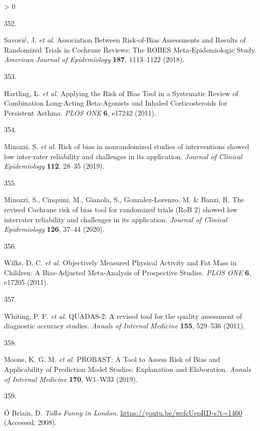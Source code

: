 \documentclass[a4paper, twoside]{templates/ociamthesis}
\newlength{\cslhangindent}
\newlength{\csllabelwidth}
\newenvironment{CSLReferences}[3] %
 {%
  \setlength{\parindent}{0pt}
  \ifodd #1 \everypar{\setlength{\hangindent}{\cslhangindent}}\ignorespaces\fi
  \ifnum #2 > 0
  \setlength{\parskip}{#2\baselineskip}
  \fi
 }%
 {}
\newcommand{\CSLLeftMargin}[1]{\parbox[t]{\maxof{\widthof{#1}}{\csllabelwidth}}{#1}}
\newcommand{\CSLRightInline}[1]{\parbox[t]{\linewidth - \csllabelwidth}{#1}}
\begin{document}
\begin{CSLReferences}{0}{0}
\leavevmode\hypertarget{ref-savovic2018}{}%
\CSLLeftMargin{352. }
\CSLRightInline{Savović, J. \emph{et al.} Association {Between Risk}-of-{Bias Assessments} and {Results} of {Randomized Trials} in {Cochrane Reviews}: The {ROBES Meta}-{Epidemiologic Study}. \emph{American Journal of Epidemiology} \textbf{187}, 1113--1122 (2018).}

\leavevmode\hypertarget{ref-hartling2011}{}%
\CSLLeftMargin{353. }
\CSLRightInline{Hartling, L. \emph{et al.} Applying the {Risk} of {Bias Tool} in a {Systematic Review} of {Combination Long}-{Acting Beta}-{Agonists} and {Inhaled Corticosteroids} for {Persistent Asthma}. \emph{PLOS ONE} \textbf{6}, e17242 (2011).}

\leavevmode\hypertarget{ref-minozzi2019}{}%
\CSLLeftMargin{354. }
\CSLRightInline{Minozzi, S. \emph{et al.} Risk of bias in nonrandomized studies of interventions showed low inter-rater reliability and challenges in its application. \emph{Journal of Clinical Epidemiology} \textbf{112}, 28--35 (2019).}

\leavevmode\hypertarget{ref-minozzi2020}{}%
\CSLLeftMargin{355. }
\CSLRightInline{Minozzi, S., Cinquini, M., Gianola, S., Gonzalez-Lorenzo, M. \& Banzi, R. The revised {Cochrane} risk of bias tool for randomized trials ({RoB} 2) showed low interrater reliability and challenges in its application. \emph{Journal of Clinical Epidemiology} \textbf{126}, 37--44 (2020).}

\leavevmode\hypertarget{ref-wilks2011}{}%
\CSLLeftMargin{356. }
\CSLRightInline{Wilks, D. C. \emph{et al.} Objectively {Measured Physical Activity} and {Fat Mass} in {Children}: A {Bias}-{Adjusted Meta}-{Analysis} of {Prospective Studies}. \emph{PLOS ONE} \textbf{6}, e17205 (2011).}

\leavevmode\hypertarget{ref-whiting2011}{}%
\CSLLeftMargin{357. }
\CSLRightInline{Whiting, P. F. \emph{et al.} {QUADAS}-2: A revised tool for the quality assessment of diagnostic accuracy studies. \emph{Annals of Internal Medicine} \textbf{155}, 529--536 (2011).}

\leavevmode\hypertarget{ref-moons2019}{}%
\CSLLeftMargin{358. }
\CSLRightInline{Moons, K. G. M. \emph{et al.} {PROBAST}: A {Tool} to {Assess Risk} of {Bias} and {Applicability} of {Prediction Model Studies}: Explanation and {Elaboration}. \emph{Annals of Internal Medicine} \textbf{170}, W1--W33 (2019).}

\leavevmode\hypertarget{ref-obriain2008}{}%
\CSLLeftMargin{359. }
\CSLRightInline{Ó Briain, D. \emph{Talks {Funny} in {London}}. \url{https://youtu.be/wcfcUepRD-s?t=1460} (Accessed: 2008).}


\end{CSLReferences}
\end{document}
